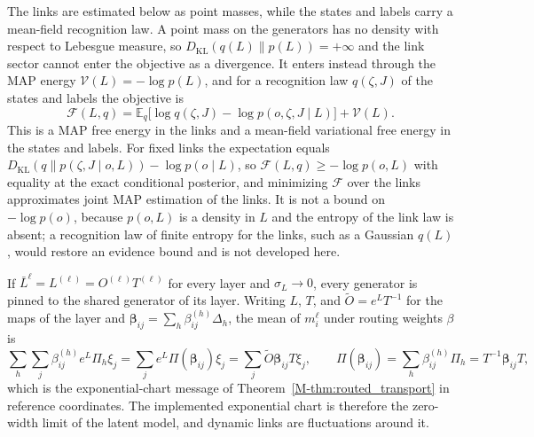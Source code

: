 \documentclass[twoside,11pt]{article}
\begin{document}
The links are estimated below as point masses, while the states and labels carry a mean-field recognition law. A point mass on the generators has no density with respect to Lebesgue measure, so $D_{\mathrm{KL}}(q(L)\|p(L))=+\infty$ and the link sector cannot enter the objective as a divergence. It enters instead through the MAP energy $\mathcal V(L)=-\log p(L)$, and for a recognition law $q(\zeta,J)$ of the states and labels the objective is
\begin{equation}
\mathcal F(L,q)=\mathbb E_q\bigl[\log q(\zeta,J)-\log p(o,\zeta,J\mid L)\bigr]+\mathcal V(L).
\label{eq:lie_map_free_energy}
\end{equation}
This is a MAP free energy in the links and a mean-field variational free energy in the states and labels. For fixed links the expectation equals $D_{\mathrm{KL}}(q\|p(\zeta,J\mid o,L))-\log p(o\mid L)$, so $\mathcal F(L,q)\ge-\log p(o,L)$ with equality at the exact conditional posterior, and minimizing $\mathcal F$ over the links approximates joint MAP estimation of the links. It is not a bound on $-\log p(o)$, because $p(o,L)$ is a density in $L$ and the entropy of the link law is absent; a recognition law of finite entropy for the links, such as a Gaussian $q(L)$, would restore an evidence bound and is not developed here.

\begin{remark}
\label{rem:lie_static_limit}
If $\bar L^\ell=L^{(\ell)}=O^{(\ell)}T^{(\ell)}$ for every layer and $\sigma_L\to0$, every generator is pinned to the shared generator of its layer. Writing $L$, $T$, and $\widetilde O=e^{L}T^{-1}$ for the maps of the layer and $\boldsymbol\beta_{ij}=\sum_h\beta_{ij}^{(h)}\Delta_h$, the mean of $m_i^\ell$ under routing weights $\beta$ is
\begin{equation*}
\sum_h\sum_j\beta_{ij}^{(h)}e^{L}\Pi_h\xi_j=\sum_je^{L}\Pi(\boldsymbol\beta_{ij})\xi_j=\sum_j\widetilde O\boldsymbol\beta_{ij}T\xi_j,\qquad\Pi(\boldsymbol\beta_{ij})=\sum_h\beta_{ij}^{(h)}\Pi_h=T^{-1}\boldsymbol\beta_{ij}T,
\end{equation*}
which is the exponential-chart message of Theorem~\ref{M-thm:routed_transport} in reference coordinates. The implemented exponential chart is therefore the zero-width limit of the latent model, and dynamic links are fluctuations around it.
\end{remark}
\end{document}
